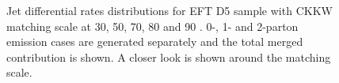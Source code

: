 \begin{figure}[h!]
{	}
	\hfill
	\hfill
  \caption{Jet differential rates distributions for EFT D5 sample with CKKW matching scale at 30, 50, 70, 80 and 90 \gev. 0-, 1- and 2-parton emission cases are generated separately and the total merged contribution is shown. A closer look is shown around the matching scale.}
  \label{fig:CKKW_D5_zoom}
\end{figure}

